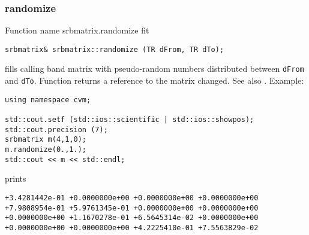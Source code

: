 \subsubsection{randomize}
Function%
\pdfdest name {srbmatrix.randomize} fit
\begin{verbatim}
srbmatrix& srbmatrix::randomize (TR dFrom, TR dTo);
\end{verbatim}
fills  calling band matrix with pseudo-random numbers distributed between
\verb"dFrom" and \verb"dTo".
Function
returns a reference to the matrix changed.
See also
.
Example:
\begin{Verbatim}
using namespace cvm;

std::cout.setf (std::ios::scientific | std::ios::showpos);
std::cout.precision (7);
srbmatrix m(4,1,0);
m.randomize(0.,1.);
std::cout << m << std::endl;
\end{Verbatim}
prints
\begin{Verbatim}
+3.4281442e-01 +0.0000000e+00 +0.0000000e+00 +0.0000000e+00
+7.9808954e-01 +5.9761345e-01 +0.0000000e+00 +0.0000000e+00
+0.0000000e+00 +1.1670278e-01 +6.5645314e-02 +0.0000000e+00
+0.0000000e+00 +0.0000000e+00 +4.2225410e-01 +7.5563829e-02
\end{Verbatim}
\newpage

